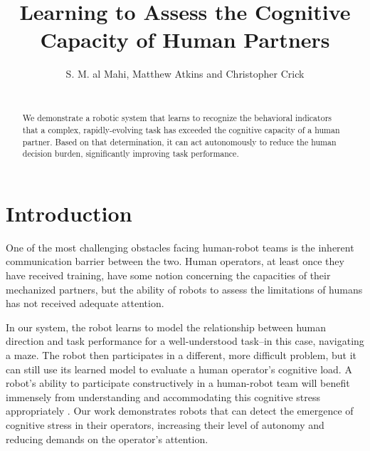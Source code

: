 \documentclass{sig-alternate-05-2015}
\begin{document}
\title{Learning to Assess the Cognitive Capacity of Human Partners}


\author{
\alignauthor
S. M. al Mahi, Matthew Atkins and Christopher Crick \\
 \\
}


\maketitle 

\begin{abstract}  We demonstrate a robotic system that learns to recognize the behavioral indicators that a complex,
rapidly-evolving task has exceeded the cognitive capacity of a human
partner.  Based on that determination, it can act autonomously to
reduce the human decision burden, significantly improving task
performance. \end{abstract}




\section{Introduction}

One of the most challenging obstacles facing human-robot teams is the
inherent communication barrier between the two.  Human operators, at
least once they have received training, have some notion concerning
the capacities of their mechanized partners, but the ability of robots
to assess the limitations of humans has not received adequate
attention.

In our system, the robot learns to model the relationship between
human direction and task performance for a well-understood task--in
this case, navigating a maze. The robot then participates in a
different, more difficult problem, but it can still use its learned
model to evaluate a human operator's cognitive load.  A robot's
ability to participate constructively in a human-robot team will
benefit immensely from understanding and accommodating this cognitive
stress appropriately \cite{crandall2005validating}. Our work
demonstrates robots that can detect the emergence of cognitive stress
in their operators, increasing their level of autonomy and reducing
demands on the operator's attention.
\end{document}
